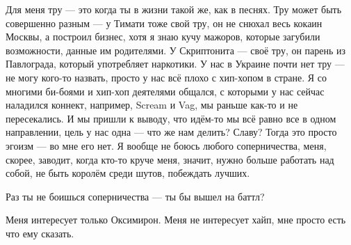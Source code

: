 Для меня тру --- это когда ты в жизни такой же, как в песнях. Тру может быть
совершенно разным --- у Тимати тоже свой тру, он не снюхал весь кокаин Москвы, а
построил бизнес, хотя я знаю кучу мажоров, которые загубили возможности, данные
им родителями.  У Скриптонита --- своё тру, он парень из Павлограда, который
употребляет наркотики. У нас в Украине почти нет тру --- не могу кого-то назвать,
просто у нас всё плохо с хип-хопом в стране. Я со многими би-боями и хип-хоп
деятелями общался, с которыми у нас сейчас наладился коннект, например, Scream
и Vag, мы раньше как-то и не пересекались. И мы пришли к выводу, что идём-то мы
всё равно все в одном направлении, цель у нас одна --- что же нам делить? Славу?
Тогда это просто эгоизм --- во мне его нет. Я вообще не боюсь любого
соперничества, меня, скорее, заводит, когда кто-то круче меня, значит, нужно
больше работать над собой, не быть королём среди шутов, побеждать лучших.

Раз ты не боишься соперничества --- ты бы вышел на баттл?

Меня интересует только Оксимирон. Меня не интересует хайп, мне просто есть что
ему сказать. 
